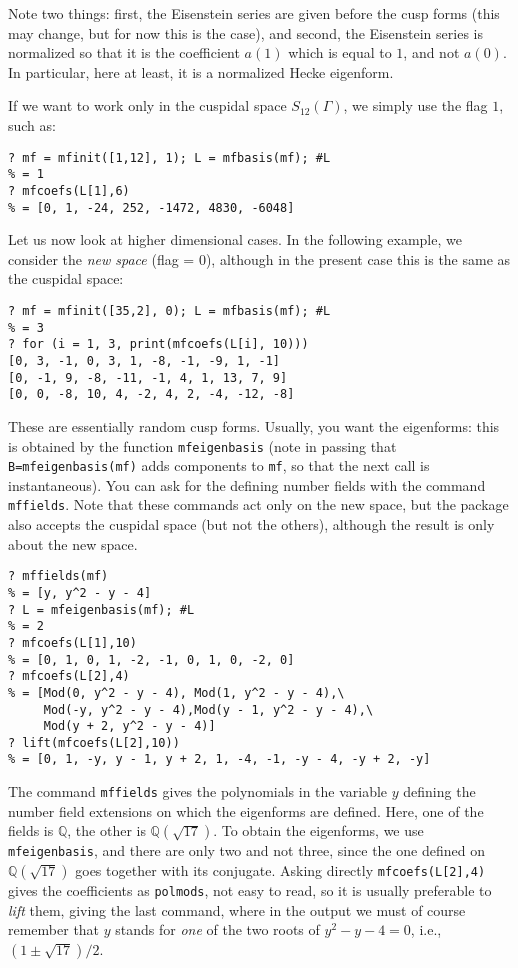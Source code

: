 \documentclass[11pt]{article}
\newcommand{\Q}{{\mathbb Q}}
\newcommand{\G}{\Gamma}
\def\kbd#1{{\tt #1}}
\begin{document}
Note two things: first, the Eisenstein series are given before the cusp forms
(this may change, but for now this is the case), and second, the Eisenstein
series is normalized so that it is the coefficient $a(1)$ which is equal to
$1$, and not $a(0)$. In particular, here at least, it is a normalized
Hecke eigenform.

If we want to work only in the cuspidal space $S_{12}(\G)$, we simply use
the flag $1$, such as:

\begin{verbatim}
? mf = mfinit([1,12], 1); L = mfbasis(mf); #L
% = 1
? mfcoefs(L[1],6)
% = [0, 1, -24, 252, -1472, 4830, -6048]
\end{verbatim}

Let us now look at higher dimensional cases. In the following example, we
consider the \emph{new space} (flag = $0$), although in the present case
this is the same as the cuspidal space:

\begin{verbatim}
? mf = mfinit([35,2], 0); L = mfbasis(mf); #L
% = 3
? for (i = 1, 3, print(mfcoefs(L[i], 10)))
[0, 3, -1, 0, 3, 1, -8, -1, -9, 1, -1]
[0, -1, 9, -8, -11, -1, 4, 1, 13, 7, 9]
[0, 0, -8, 10, 4, -2, 4, 2, -4, -12, -8]
\end{verbatim}

These are essentially random cusp forms. Usually, you want the eigenforms:
this is obtained by the function \kbd{mfeigenbasis} (note in passing that
\kbd{B=mfeigenbasis(mf)} adds components to \kbd{mf}, so that the next
call is instantaneous). You can ask for the defining number fields with the
command \kbd{mffields}. Note that these commands act only on the new space,
but the package also accepts the cuspidal space (but not the others),
although the result is only about the new space.

\begin{verbatim}
? mffields(mf)
% = [y, y^2 - y - 4]
? L = mfeigenbasis(mf); #L
% = 2
? mfcoefs(L[1],10)
% = [0, 1, 0, 1, -2, -1, 0, 1, 0, -2, 0]
? mfcoefs(L[2],4)
% = [Mod(0, y^2 - y - 4), Mod(1, y^2 - y - 4),\
     Mod(-y, y^2 - y - 4),Mod(y - 1, y^2 - y - 4),\
     Mod(y + 2, y^2 - y - 4)]
? lift(mfcoefs(L[2],10))
% = [0, 1, -y, y - 1, y + 2, 1, -4, -1, -y - 4, -y + 2, -y]
\end{verbatim}

The command \kbd{mffields} gives the polynomials in the variable $y$ defining
the number field extensions on which
the eigenforms are defined. Here, one of the fields is $\Q$, the other is
$\Q(\sqrt{17})$. To obtain the eigenforms, we use \kbd{mfeigenbasis}, and
there are only two and not three, since the one defined on $\Q(\sqrt{17})$
goes together with its conjugate. Asking directly \kbd{mfcoefs(L[2],4)} gives
the coefficients as \kbd{polmods}, not easy to read, so it is usually
preferable to \emph{lift} them, giving the last command, where in the output
we must of course remember that $y$ stands for \emph{one} of the two roots
of $y^2-y-4=0$, i.e., $(1\pm\sqrt{17})/2$.
\end{document}
